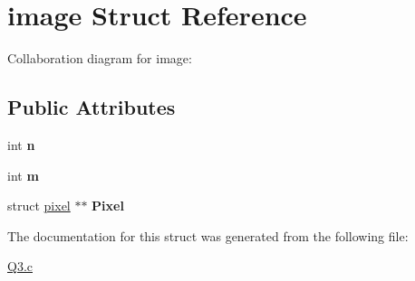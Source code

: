 \hypertarget{structimage}{}\section{image Struct Reference}
\label{structimage}


Collaboration diagram for image\+:
\subsection*{Public Attributes}
\begin{DoxyCompactItemize}
\item 
\mbox{\label{structimage_a67dc2999e33bb7b06f57523e7dd9f0dc}} 
int {\bfseries n}
\item 
\mbox{\label{structimage_a593ffb6e3b823cf24df856643ba92efc}} 
int {\bfseries m}
\item 
\mbox{\label{structimage_a948848a59125f93533e2152ef71f9303}} 
struct \hyperlink{structpixel}{pixel} $\ast$$\ast$ {\bfseries Pixel}
\end{DoxyCompactItemize}


The documentation for this struct was generated from the following file\+:\begin{DoxyCompactItemize}
\item 
\hyperlink{Q3_8c}{Q3.\+c}\end{DoxyCompactItemize}
